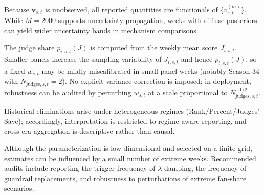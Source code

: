 Because $\mathbf v_{s,t}$ is unobserved, all reported quantities are functionals of $\{v^{(m)}_{s,t}\}$. While $M=2000$ supports uncertainty propagation, weeks with diffuse posteriors can yield wider uncertainty bands in mechanism comparisons.

The judge share $p_{i,s,t}(J)$ is computed from the weekly mean score $J_{i,s,t}$. Smaller panels increase the sampling variability of $J_{i,s,t}$ and hence $p_{i,s,t}(J)$, so a fixed $w_{s,t}$ may be mildly miscalibrated in small-panel weeks (notably Season 34 with $N_{\mathrm{judges},s,t}=2$). No explicit variance correction is imposed; in deployment, robustness can be audited by perturbing $w_{s,t}$ at a scale proportional to $N_{\mathrm{judges},s,t}^{-1/2}$.

Historical eliminations arise under heterogeneous regimes (Rank/Percent/Judges’ Save); accordingly, interpretation is restricted to regime-aware reporting, and cross-era aggregation is descriptive rather than causal.

Although the parameterization is low-dimensional and selected on a finite grid, estimates can be influenced by a small number of extreme weeks. Recommended audits include reporting the trigger frequency of $\lambda$-damping, the frequency of guardrail replacements, and robustness to perturbations of extreme fan-share scenarios.

